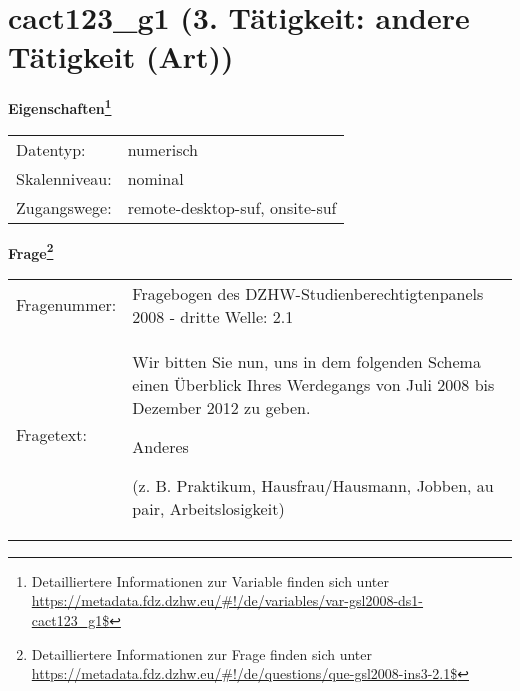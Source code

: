 
    \setcounter{footnote}{0}

    \vspace*{-1.8cm}
	\section{cact123\_g1 (3. Tätigkeit: andere Tätigkeit (Art))}
	\label{section:cact123_g1}



    \vspace*{0.5cm}
    \noindent\textbf{Eigenschaften\footnote{Detailliertere Informationen zur Variable finden sich unter
		\url{https://metadata.fdz.dzhw.eu/\#!/de/variables/var-gsl2008-ds1-cact123_g1$}}}\\
	\begin{tabularx}{\hsize}{@{}lX}
	Datentyp: & numerisch \\
	Skalenniveau: & nominal \\
	Zugangswege: &
	  remote-desktop-suf, 
	  onsite-suf
 \\
    \end{tabularx}



				\vspace*{0.5cm}
                \noindent\textbf{Frage\footnote{Detailliertere Informationen zur Frage finden sich unter
		              \url{https://metadata.fdz.dzhw.eu/\#!/de/questions/que-gsl2008-ins3-2.1$}}}\\
				\begin{tabularx}{\hsize}{@{}lX}
					Fragenummer: &
					  Fragebogen des DZHW-Studienberechtigtenpanels 2008 - dritte Welle:
					  2.1
 \\
					Fragetext: & Wir bitten Sie nun, uns in dem folgenden Schema einen Überblick Ihres Werdegangs von Juli 2008 bis Dezember 2012 zu geben.\par  Anderes\par  (z. B. Praktikum, Hausfrau/Hausmann, Jobben, au pair, Arbeitslosigkeit) \\
				\end{tabularx}





